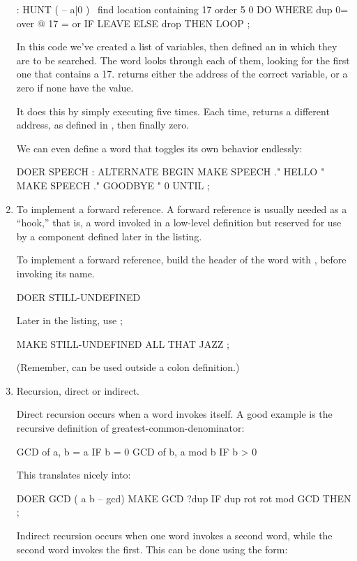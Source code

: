 \begin{enumerate}
\begin{Code}
: HUNT  ( -- a|0 )  \  find location containing 17
   order  5 0 DO  WHERE  dup 0=  over @  17 =  or  IF
      LEAVE  ELSE  drop  THEN  LOOP ;
\end{Code}
In this code we've created a list of variables, then defined an
 in which they are to be searched. The word 
looks through each of them, looking for the first one that contains a 17.
 returns either the address of the correct variable, or a zero
if none have the value.

It does this by simply executing  five times. Each time,
 returns a different address, as defined in ,
then finally zero.

We can even define a  word that toggles its own behavior
endlessly:

\begin{Code}
DOER SPEECH
: ALTERNATE
   BEGIN  MAKE SPEECH ." HELLO "
   MAKE SPEECH ." GOODBYE "
   0 UNTIL ;
\end{Code}
\item To implement a forward reference. A forward reference is usually
needed as a ``hook,'' that is, a word invoked in a low-level definition
but reserved for use by a component defined later in the listing.

To implement a forward reference, build the header of the word with
, before invoking its name.

\begin{Code}
DOER STILL-UNDEFINED
\end{Code}
Later in the listing, use ;

\begin{Code}
MAKE STILL-UNDEFINED  ALL THAT JAZZ ;
\end{Code}
(Remember,  can be used outside a colon definition.)

\item Recursion, direct or indirect.

Direct recursion occurs when a word invokes itself. A good example is the
recursive definition of greatest-common-denominator:

\begin{Code}
GCD of a, b =  a                     IF b = 0
               GCD of b, a mod b     IF b > 0
\end{Code}
This translates nicely into:

\begin{Code}
DOER GCD ( a b -- gcd)
MAKE GCD  ?dup  IF  dup rot rot  mod  GCD  THEN ;
\end{Code}
Indirect recursion occurs when one word invokes a second word, while the
second word invokes the first. This can be done using the form:


\end{enumerate}
